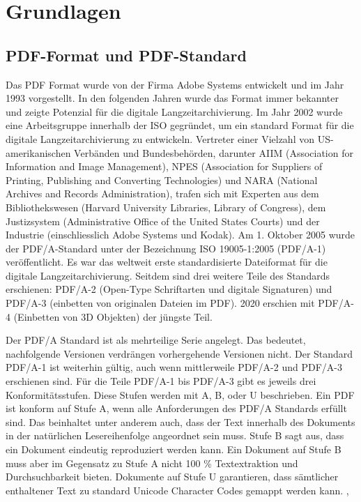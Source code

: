 \documentclass[a4paper,oneside, 12pt]{report}
\begin{document}
\chapter{Grundlagen}\label{sec:grundlagen}
\section{PDF-Format und PDF-Standard}
Das PDF Format wurde von der Firma Adobe Systems entwickelt und im Jahr 1993 vorgestellt. In den folgenden Jahren wurde das Format immer bekannter und zeigte Potenzial für die digitale Langzeitarchivierung. Im Jahr 2002 wurde eine Arbeitsgruppe innerhalb der \ac{ISO} gegründet, um ein standard Format für die digitale Langzeitarchivierung zu entwickeln. Vertreter einer Vielzahl von US-amerikanischen Verbänden und Bundesbehörden, darunter AIIM (Association for Information and Image Management), NPES (Association for Suppliers of Printing, Publishing and Converting Technologies) und NARA (National Archives and Records Administration), trafen sich mit Experten aus dem Bibliothekswesen (Harvard University Libraries, Library of Congress), dem Justizsystem (Administrative Office of the United States Courts) und der Industrie (einschliesslich Adobe Systems und Kodak). Am 1. Oktober 2005 wurde der PDF/A-Standard unter der Bezeichnung ISO 19005-1:2005 (PDF/A-1) veröffentlicht. Es war das weltweit erste standardisierte Dateiformat für die digitale Langzeitarchivierung. Seitdem sind drei weitere Teile des Standards erschienen: PDF/A-2 (Open-Type Schriftarten und digitale Signaturen) und PDF/A-3 (einbetten von originalen Dateien im PDF). 2020 erschien mit PDF/A-4 (Einbetten von 3D Objekten) der jüngste Teil. \cite{pdfhist}

Der PDF/A Standard ist als mehrteilige Serie angelegt. Das bedeutet, nachfolgende Versionen verdrängen vorhergehende Versionen nicht. Der Standard PDF/A-1 ist weiterhin gültig, auch wenn mittlerweile PDF/A-2 und PDF/A-3 erschienen sind. Für die Teile PDF/A-1 bis PDF/A-3 gibt es jeweils drei Konformitätsstufen. Diese Stufen werden mit A, B, oder U beschrieben. Ein PDF ist konform auf Stufe A, wenn alle Anforderungen des PDF/A Standards erfüllt sind. Das beinhaltet unter anderem auch, dass der Text innerhalb des Dokuments in der natürlichen Lesereihenfolge angeordnet sein muss. Stufe B sagt aus, dass ein Dokument eindeutig reproduziert werden kann. Ein Dokument auf Stufe B muss aber im Gegensatz zu Stufe A nicht 100 \% Textextraktion und Durchsuchbarkeit bieten. Dokumente auf Stufe U garantieren, dass sämtlicher enthaltener Text zu standard Unicode Character Codes gemappt werden kann. \cite{pdfhist}, \cite{pdftools}
\end{document}
